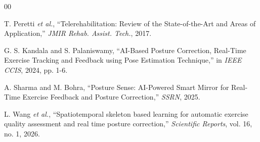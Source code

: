 \documentclass[conference]{IEEEtran}
\begin{document}
\begin{thebibliography}{00}

T. Peretti \textit{et al.}, ``Telerehabilitation: Review of the State-of-the-Art and Areas of Application,'' \textit{JMIR Rehab. Assist. Tech.}, 2017.

G. S. Kandala and S. Palaniswamy, ``AI-Based Posture Correction, Real-Time Exercise Tracking and Feedback using Pose Estimation Technique,'' in \textit{IEEE CCIS}, 2024, pp. 1-6.

A. Sharma and M. Bohra, ``Posture Sense: AI-Powered Smart Mirror for Real-Time Exercise Feedback and Posture Correction,'' \textit{SSRN}, 2025.

L. Wang \textit{et al.}, ``Spatiotemporal skeleton based learning for automatic exercise quality assessment and real time posture correction,'' \textit{Scientific Reports}, vol. 16, no. 1, 2026.

\end{thebibliography}
\end{document}
